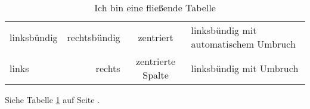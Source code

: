 \documentclass[12pt,ngerman]{scrartcl}
\begin{document}
\listoftables

\begin{center}
\begin{table}[b]
\caption{Ich bin eine fließende Tabelle}\label{tab:ersteTabelle}
\begin{tabular}{lrcp{5cm}}
linksbündig & rechtsbündig & zentriert & linksbündig mit automatischem Umbruch \\
links & rechts & zentrierte Spalte & linksbündig mit Umbruch \\
\end{tabular}
\end{table}
\end{center}

Siehe Tabelle \ref{tab:ersteTabelle} auf Seite \pageref{tab:ersteTabelle}.
\end{document}
